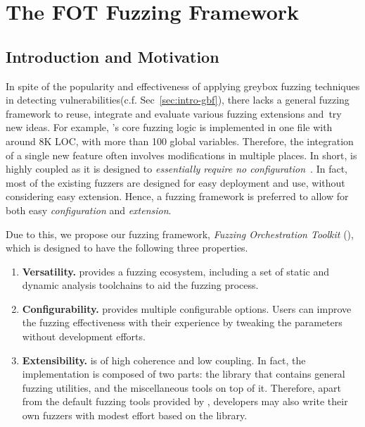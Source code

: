 
\chapter{The FOT Fuzzing Framework} \label{ch:fot}


\section{Introduction and Motivation}


In spite of the popularity and effectiveness of applying greybox fuzzing techniques in detecting vulnerabilities(c.f. Sec~\ref{sec:intro-gbf}), there lacks a general fuzzing framework to reuse, integrate and evaluate various fuzzing extensions and~try new ideas.
For example, {\AFL}'s core fuzzing logic is implemented in one file with around 8K LOC, with more than 100 global variables. Therefore, the integration of a single new feature often involves modifications in multiple places.
In short, {\AFL} is highly coupled as it is designed to \textit{essentially require no configuration}~\cite{afl}.
In fact, most of the existing fuzzers are designed for easy deployment and use, without considering easy extension.
Hence, a fuzzing framework is preferred to allow for both easy \emph{configuration} and \emph{extension}.


Due to this, we propose our fuzzing framework, \emph{Fuzzing Orchestration Toolkit} ({\FOT}), which is designed to have the following three properties.

\begin{enumerate}[(1)]

\item  \textbf{Versatility.}
{\FOT} provides a fuzzing ecosystem, including a set of static and dynamic analysis toolchains to aid the fuzzing process.
\item \textbf{Configurability.}
{\FOT} provides multiple configurable options.	
Users can improve the fuzzing effectiveness with their experience by tweaking the parameters without development efforts.
\item \textbf{Extensibility.}
{\FOT} is of high coherence and low coupling. In fact, the implementation is composed of two parts: the library that contains general fuzzing utilities, and the miscellaneous tools on top of it. Therefore, apart from the default fuzzing tools provided by {\FOT}, developers may also write their own fuzzers with modest effort based on the library.
\end{enumerate}



